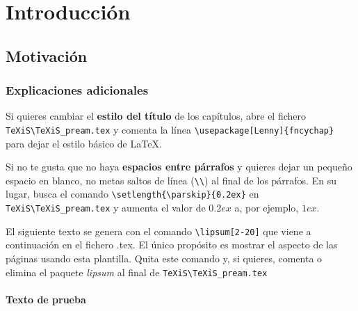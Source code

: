 \chapter{Introducción}
\label{cap:introduccion}





\section{Motivación}
\subsection{Explicaciones adicionales}
Si quieres cambiar el \textbf{estilo del título} de los capítulos, abre el fichero \verb|TeXiS\TeXiS_pream.tex| y comenta la línea \verb|\usepackage[Lenny]{fncychap}| para dejar el estilo básico de \LaTeX.

Si no te gusta que no haya \textbf{espacios entre párrafos} y quieres dejar un pequeño espacio en blanco, no metas saltos de línea (\verb|\\|) al final de los párrafos. En su lugar, busca el comando  \verb|\setlength{\parskip}{0.2ex}| en \verb|TeXiS\TeXiS_pream.tex| y aumenta el valor de $0.2ex$ a, por ejemplo, $1ex$.

El siguiente texto se genera con el comando \verb|\lipsum[2-20]| que viene a continuación en el fichero .tex. El único propósito es mostrar el aspecto de las páginas usando esta plantilla. Quita este comando y, si quieres, comenta o elimina el paquete \textit{lipsum} al final de \verb|TeXiS\TeXiS_pream.tex|

\subsubsection{Texto de prueba}


\lipsum[2-20]
